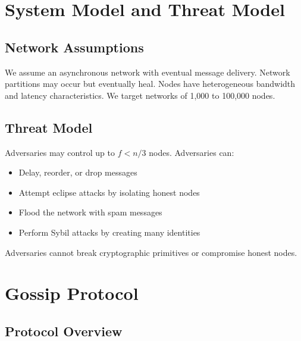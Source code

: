 \documentclass[11pt,a4paper]{article}
\begin{document}
\section{System Model and Threat Model}

\subsection{Network Assumptions}

We assume an asynchronous network with eventual message delivery. Network partitions may occur but eventually heal. Nodes have heterogeneous bandwidth and latency characteristics. We target networks of 1,000 to 100,000 nodes.

\subsection{Threat Model}

Adversaries may control up to $f < n/3$ nodes. Adversaries can:
\begin{itemize}
    \item Delay, reorder, or drop messages
    \item Attempt eclipse attacks by isolating honest nodes
    \item Flood the network with spam messages
    \item Perform Sybil attacks by creating many identities
\end{itemize}

Adversaries cannot break cryptographic primitives or compromise honest nodes.

\section{Gossip Protocol}

\subsection{Protocol Overview}
\end{document}
